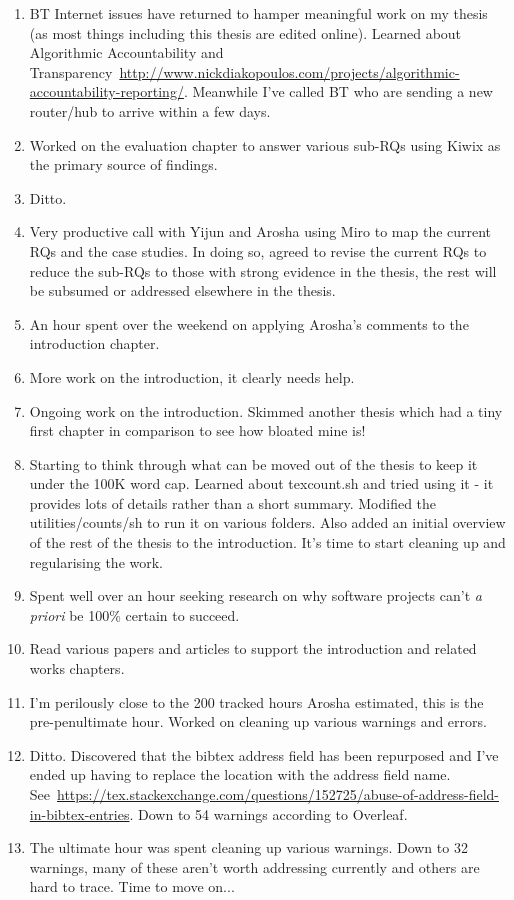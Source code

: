 \begin{enumerate}
    \item BT Internet issues have returned to hamper meaningful work on my thesis (as most things including this thesis are edited online). Learned about Algorithmic Accountability and Transparency~\url{http://www.nickdiakopoulos.com/projects/algorithmic-accountability-reporting/}. Meanwhile I've called BT who are sending a new router/hub to arrive within a few days.
    \item Worked on the evaluation chapter to answer various sub-RQs using Kiwix as the primary source of findings.
    \item Ditto.
    \item Very productive call with Yijun and Arosha using Miro to map the current RQs and the case studies. In doing so, agreed to revise the current RQs to reduce the sub-RQs to those with strong evidence in the thesis, the rest will be subsumed or addressed elsewhere in the thesis.
    \item An hour spent over the weekend on applying Arosha's comments to the introduction chapter. 
    \item More work on the introduction, it clearly needs help.
    \item Ongoing work on the introduction. Skimmed another thesis which had a tiny first chapter in comparison to see how bloated mine is!
    \item Starting to think through what can be moved out of the thesis to keep it under the 100K word cap. Learned about texcount.sh and tried using it - it provides lots of details rather than a short summary. Modified the utilities/counts/sh to run it on various folders. Also added an initial overview of the rest of the thesis to the introduction. It's time to start cleaning up and regularising the work.
    \item Spent well over an hour seeking research on why software projects can't \emph{a priori} be 100\% certain to succeed.
    \item Read various papers and articles to support the introduction and related works chapters.
    \item I'm perilously close to the 200 tracked hours Arosha estimated, this is the pre-penultimate hour. Worked on cleaning up various warnings and errors.
    \item Ditto. Discovered that the bibtex address field has been repurposed and I've ended up having to replace the location with the address field name. See~\url{https://tex.stackexchange.com/questions/152725/abuse-of-address-field-in-bibtex-entries}. Down to 54 warnings according to Overleaf.
    \item The ultimate hour was spent cleaning up various warnings. Down to 32 warnings, many of these aren't worth addressing currently and others are hard to trace. Time to move on...
\end{enumerate}
